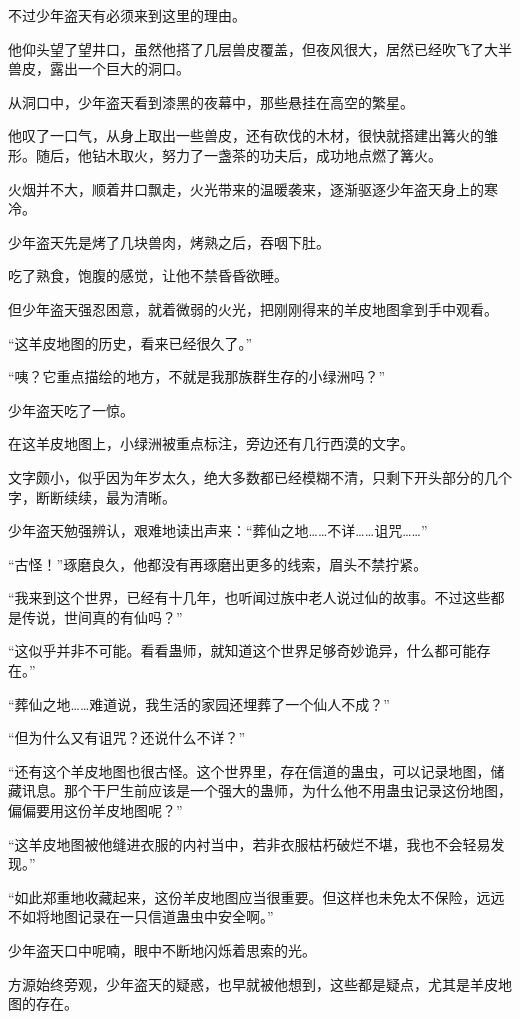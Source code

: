 \begin{this_body}
不过少年盗天有必须来到这里的理由。

他仰头望了望井口，虽然他搭了几层兽皮覆盖，但夜风很大，居然已经吹飞了大半兽皮，露出一个巨大的洞口。

从洞口中，少年盗天看到漆黑的夜幕中，那些悬挂在高空的繁星。

他叹了一口气，从身上取出一些兽皮，还有砍伐的木材，很快就搭建出篝火的雏形。随后，他钻木取火，努力了一盏茶的功夫后，成功地点燃了篝火。

火烟并不大，顺着井口飘走，火光带来的温暖袭来，逐渐驱逐少年盗天身上的寒冷。

少年盗天先是烤了几块兽肉，烤熟之后，吞咽下肚。

吃了熟食，饱腹的感觉，让他不禁昏昏欲睡。

但少年盗天强忍困意，就着微弱的火光，把刚刚得来的羊皮地图拿到手中观看。

“这羊皮地图的历史，看来已经很久了。”

“咦？它重点描绘的地方，不就是我那族群生存的小绿洲吗？”

少年盗天吃了一惊。

在这羊皮地图上，小绿洲被重点标注，旁边还有几行西漠的文字。

文字颇小，似乎因为年岁太久，绝大多数都已经模糊不清，只剩下开头部分的几个字，断断续续，最为清晰。

少年盗天勉强辨认，艰难地读出声来：“葬仙之地……不详……诅咒……”

“古怪！”琢磨良久，他都没有再琢磨出更多的线索，眉头不禁拧紧。

“我来到这个世界，已经有十几年，也听闻过族中老人说过仙的故事。不过这些都是传说，世间真的有仙吗？”

“这似乎并非不可能。看看蛊师，就知道这个世界足够奇妙诡异，什么都可能存在。”

“葬仙之地……难道说，我生活的家园还埋葬了一个仙人不成？”

“但为什么又有诅咒？还说什么不详？”

“还有这个羊皮地图也很古怪。这个世界里，存在信道的蛊虫，可以记录地图，储藏讯息。那个干尸生前应该是一个强大的蛊师，为什么他不用蛊虫记录这份地图，偏偏要用这份羊皮地图呢？”

“这羊皮地图被他缝进衣服的内衬当中，若非衣服枯朽破烂不堪，我也不会轻易发现。”

“如此郑重地收藏起来，这份羊皮地图应当很重要。但这样也未免太不保险，远远不如将地图记录在一只信道蛊虫中安全啊。”

少年盗天口中呢喃，眼中不断地闪烁着思索的光。

方源始终旁观，少年盗天的疑惑，也早就被他想到，这些都是疑点，尤其是羊皮地图的存在。


\end{this_body}
